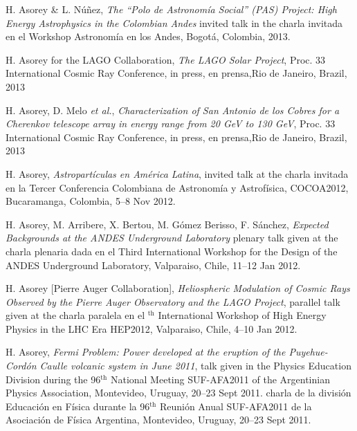 \begin{etaremune}
\item {}H. Asorey \& L. Núñez, {\emph{The ``Polo de Astronomía Social'' (PAS) Project: High Energy Astrophysics in the Colombian Andes}} \ifeng invited talk in the \else charla invitada en el \fi Workshop Astronomía en los Andes, Bogotá, Colombia, 2013.
    
\item {}H. Asorey for the LAGO Collaboration, {\emph{The LAGO Solar Project}}, \en Proc. 33 International Cosmic Ray Conference, \ifeng in press, \else en prensa,\fi  Rio de Janeiro, Brazil, 2013

\item {}H. Asorey, D. Melo {\emph{et al.}}, {\emph{Characterization of San Antonio de los Cobres for a Cherenkov telescope array in energy range from 20 GeV to 130 GeV}}, \en Proc. 33 International Cosmic Ray Conference, \ifeng in press, \else en prensa,\fi  Rio de Janeiro, Brazil, 2013

\item {} H. Asorey, {\emph{Astropartículas en América Latina}}, 
\ifeng
invited talk at the
\else
charla invitada en la 
\fi
Tercer Conferencia Colombiana de Astronomía y Astrofísica, COCOA2012, Bucaramanga, Colombia, 5--8 Nov 2012.

\item {} H. Asorey, M. Arribere, X. Bertou, M. Gómez Berisso, F. Sánchez,
{\emph{Expected Backgrounds at the ANDES Underground Laboratory}}
\ifeng
plenary talk given at the
\else
charla plenaria dada en el
\fi
Third International Workshop for the Design of the ANDES Underground Laboratory, Valparaiso, Chile, 11--12 Jan 2012.

\item {}H. Asorey [Pierre Auger Collaboration], {\emph{Heliospheric
Modulation of Cosmic Rays Observed by the Pierre Auger Observatory and the LAGO
Project}}, 
\ifeng
parallel talk given at the 
\else
charla paralela en el 
$^{\mathrm{th}}$ International Workshop of High Energy Physics in the LHC Era HEP2012, Valparaiso, Chile, 4--10 Jan 2012.

\item {}H. Asorey, {\emph{Fermi Problem: Power developed at the eruption of the Puyehue-Cordón Caulle volcanic system in June 2011}}, 
\ifeng
talk given in the Physics Education Division during the 96$^{\mathrm{th}}$ National Meeting SUF-AFA2011 of the Argentinian Physics Association, Montevideo, Uruguay, 20--23 Sept 2011.
\else
charla de la división Educación en Física durante la 96$^{\mathrm{th}}$ Reunión Anual SUF-AFA2011 de la Asociación de Física Argentina, Montevideo, Uruguay, 20--23 Sept 2011.
\fi


\end{etaremune}
